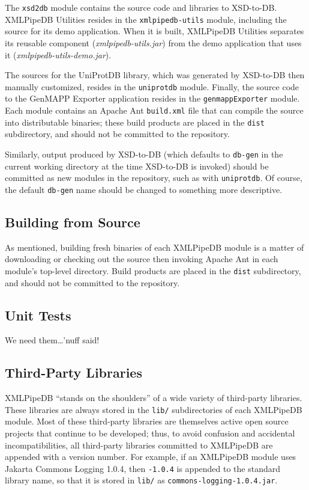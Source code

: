 \documentclass[11pt]{article}
\begin{document}
The \texttt{xsd2db} module contains the source code and libraries to XSD-to-DB.  XMLPipeDB Utilities resides in the \texttt{xmlpipedb-utils} module, including the source for its demo application.  When it is built, XMLPipeDB Utilities separates its reusable component (\emph{xmlpipedb-utils.jar}) from the demo application that uses it (\emph{xmlpipedb-utils-demo.jar}).

The sources for the UniProtDB library, which was generated by XSD-to-DB then manually customized, resides in the \texttt{uniprotdb} module.  Finally, the source code to the GenMAPP Exporter application resides in the \texttt{genmappExporter} module.  Each module contains an Apache Ant \texttt{build.xml} file that can compile the source into distributable binaries; these build products are placed in the \texttt{dist} subdirectory, and should not be committed to the repository.

Similarly, output produced by XSD-to-DB (which defaults to \texttt{db-gen} in the current working directory at the time XSD-to-DB is invoked) should be committed as new modules in the repository, such as with \texttt{uniprotdb}.  Of course, the default \texttt{db-gen} name should be changed to something more descriptive.

\subsection{Building from Source}

As mentioned, building fresh binaries of each XMLPipeDB module is a matter of downloading or checking out the source then invoking Apache Ant in each module's top-level directory.  Build products are placed in the \texttt{dist} subdirectory, and should not be committed to the repository.

\subsection{Unit Tests}

We need them\ldots'nuff said!

\subsection{Third-Party Libraries}

XMLPipeDB ``stands on the shoulders'' of a wide variety of third-party libraries.  These libraries are always stored in the \texttt{lib/} subdirectories of each XMLPipeDB module.  Most of these third-party libraries are themselves active open source projects that continue to be developed; thus, to avoid confusion and accidental incompatibilities, all third-party libraries committed to XMLPipeDB are appended with a version number.  For example, if an XMLPipeDB module uses Jakarta Commons Logging 1.0.4, then \texttt{-1.0.4} is appended to the standard library name, so that it is stored in \texttt{lib/} as \texttt{commons-logging-1.0.4.jar}.
\end{document}

